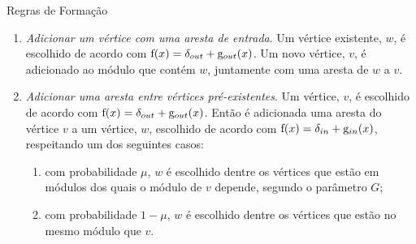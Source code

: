 \begin{section}{Regras de Formação}
\begin{enumerate}
\item \emph{Adicionar um vértice com uma aresta de entrada}. Um vértice existente, $w$, é escolhido de acordo com $\mathrm{f}(x) = \delta_{out} + \mathrm{g}_{out}(x)$. Um novo vértice, $v$, é adicionado ao módulo que contém $w$, juntamente com uma aresta de $w$ a $v$.

\item \emph{Adicionar uma aresta entre vértices pré-existentes}. Um vértice, $v$, é escolhido de acordo com $\mathrm{f}(x) = \delta_{out} + \mathrm{g}_{out}(x)$. Então é adicionada uma aresta do vértice $v$ a um vértice, $w$, escolhido de acordo com $\mathrm{f}(x) = \delta_{in} + \mathrm{g}_{in}(x)$, respeitando um dos seguintes casos:

\begin{enumerate}
  \item com probabilidade $\mu$, $w$ é escolhido dentre os vértices que estão em módulos dos quais o módulo de $v$ depende, segundo o parâmetro $G$;
  \item com probabilidade $1 - \mu$, $w$ é escolhido dentre os vértices que estão no mesmo módulo que $v$.
\end{enumerate}

\end{enumerate}
\end{section}

